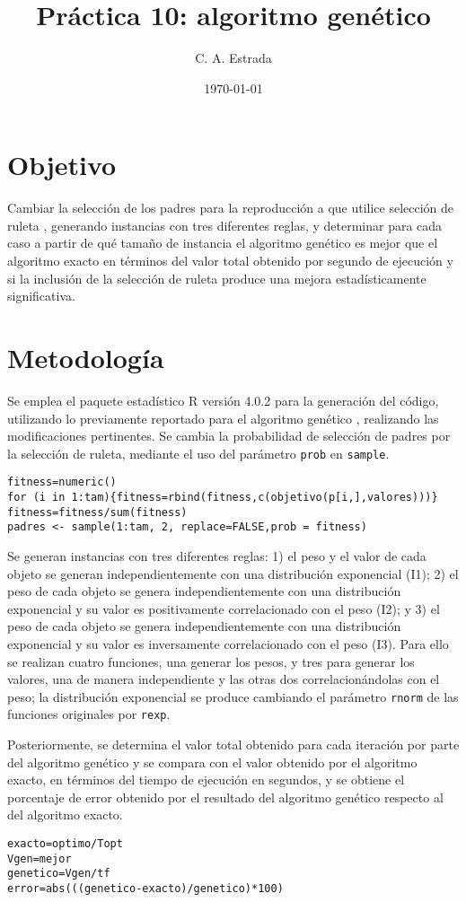 \documentclass{article}
\title{\bf Práctica 10: algoritmo genético}
\date{\today}
\author{C. A. Estrada}
\begin{document}
\maketitle

\section{Objetivo}
Cambiar la selección de los padres para la reproducción a que utilice selección de ruleta \cite{dra}, generando instancias con tres diferentes reglas, y determinar para cada caso a partir de qué tamaño de instancia el algoritmo genético es mejor que el algoritmo exacto en términos del valor total obtenido por segundo de ejecución y si la inclusión de la selección de ruleta produce una mejora estadísticamente significativa.

\section{Metodología}
Se emplea el paquete estadístico R versión 4.0.2 \cite{R} para la generación del código, utilizando lo previamente reportado para el algoritmo genético \cite{dra}, realizando las modificaciones pertinentes. Se cambia la probabilidad de selección de padres por la selección de ruleta, mediante el uso del parámetro \texttt{prob} en \texttt{sample}.
\begin{lstlisting}
fitness=numeric()
for (i in 1:tam){fitness=rbind(fitness,c(objetivo(p[i,],valores)))}
fitness=fitness/sum(fitness)
padres <- sample(1:tam, 2, replace=FALSE,prob = fitness)
\end{lstlisting}

Se generan instancias con tres diferentes reglas: 1) el peso y el valor de cada objeto se generan independientemente con una distribución exponencial (I1); 2) el peso de cada objeto se genera independientemente con una distribución exponencial y su valor es positivamente correlacionado con el peso (I2); y 3) el peso de cada objeto se genera independientemente con una distribución exponencial y su valor es inversamente correlacionado con el peso (I3). Para ello se realizan cuatro funciones, una generar los pesos, y tres para generar los valores, una de manera independiente y las otras dos correlacionándolas con el peso; la distribución exponencial se produce cambiando el parámetro \texttt{rnorm} de las funciones originales por \texttt{rexp}.

Posteriormente, se determina el valor total obtenido para cada iteración por parte del algoritmo genético y se compara con el valor obtenido por el algoritmo exacto, en términos del tiempo de ejecución en segundos, y se obtiene el porcentaje de error obtenido por el resultado del algoritmo genético respecto al del algoritmo exacto.
\begin{lstlisting}
exacto=optimo/Topt
Vgen=mejor
genetico=Vgen/tf
error=abs(((genetico-exacto)/genetico)*100)
\end{lstlisting}
\end{document}
